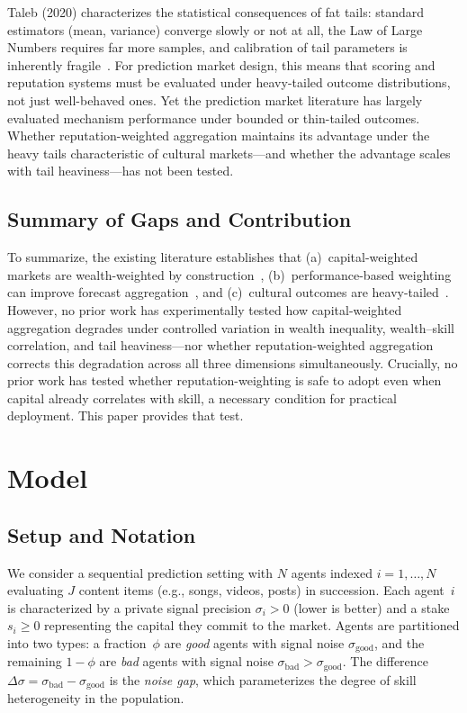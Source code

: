 \documentclass[conference]{IEEEtran}
\begin{document}
Taleb (2020) characterizes the statistical consequences of fat tails: standard estimators (mean, variance) converge slowly or not at all, the Law of Large Numbers requires far more samples, and calibration of tail parameters is inherently fragile~\cite{taleb2020}. For prediction market design, this means that scoring and reputation systems must be evaluated under heavy-tailed outcome distributions, not just well-behaved ones. Yet the prediction market literature has largely evaluated mechanism performance under bounded or thin-tailed outcomes. Whether reputation-weighted aggregation maintains its advantage under the heavy tails characteristic of cultural markets---and whether the advantage scales with tail heaviness---has not been tested.

\subsection{Summary of Gaps and Contribution}
\label{sec:related-gaps}

To summarize, the existing literature establishes that (a)~capital-weighted markets are wealth-weighted by construction~\cite{wolfers2006,manski2006}, (b)~performance-based weighting can improve forecast aggregation~\cite{budescu2015,mellers2015,atanasov2017}, and (c)~cultural outcomes are heavy-tailed~\cite{elberse2013,shapiro2023}. However, no prior work has experimentally tested how capital-weighted aggregation degrades under controlled variation in wealth inequality, wealth--skill correlation, and tail heaviness---nor whether reputation-weighted aggregation corrects this degradation across all three dimensions simultaneously. Crucially, no prior work has tested whether reputation-weighting is safe to adopt even when capital already correlates with skill, a necessary condition for practical deployment. This paper provides that test.

\section{Model}
\label{sec:model}

\subsection{Setup and Notation}
\label{sec:model-setup}

We consider a sequential prediction setting with $N$ agents indexed $i = 1, \dots, N$ evaluating $J$ content items (e.g., songs, videos, posts) in succession. Each agent~$i$ is characterized by a private signal precision $\sigma_i > 0$ (lower is better) and a stake $s_i \geq 0$ representing the capital they commit to the market. Agents are partitioned into two types: a fraction~$\phi$ are \emph{good} agents with signal noise $\sigma_{\text{good}}$, and the remaining $1 - \phi$ are \emph{bad} agents with signal noise $\sigma_{\text{bad}} > \sigma_{\text{good}}$. The difference $\Delta\sigma = \sigma_{\text{bad}} - \sigma_{\text{good}}$ is the \emph{noise gap}, which parameterizes the degree of skill heterogeneity in the population.
\end{document}
